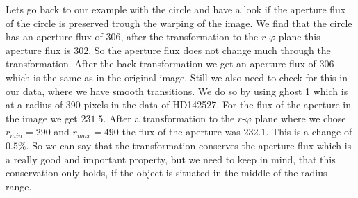 Lets go back to our example with the circle and have a look if the aperture flux of the circle is preserved trough the warping of the image. We find that the circle has an aperture flux of $306$, after the transformation to the $r$-$\varphi$ plane this aperture flux is $302$. So the aperture flux does not change much through the transformation. After the back transformation we get an aperture flux of $306$ which is the same as in the original image. Still we also need to check for this in our data, where we have smooth transitions. We do so by using ghost 1 which is at a radius of $390$ pixels in the data of HD142527. For the flux of the aperture in the image we get $231.5$. After a transformation to the $r$-$\varphi$ plane where we chose $r_{min}=290$ and $r_{max}=490$ the flux of the aperture was $232.1$. This is a change of $0.5 \%$. So we can say that the transformation conserves the aperture flux which is a really good and important property, but we need to keep in mind, that this conservation only holds, if the object is situated in the middle of the radius range.